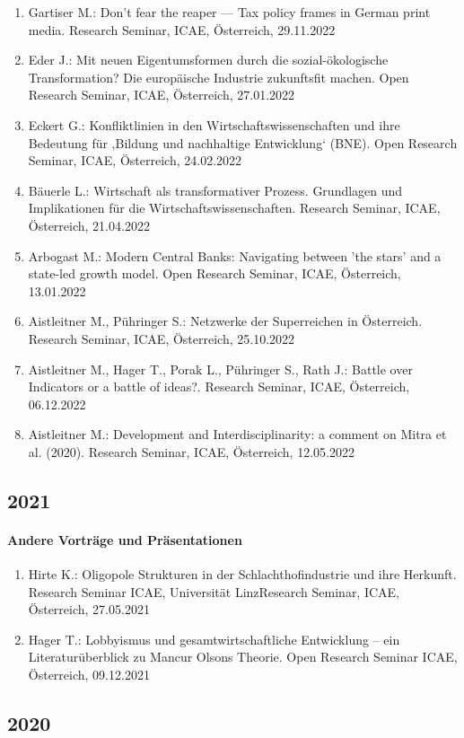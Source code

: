 \begin{enumerate}
	\item Gartiser M.: Don’t fear the reaper — Tax policy frames in German print media. Research Seminar, ICAE, Österreich, 29.11.2022
	\item Eder J.: Mit neuen Eigentumsformen durch die sozial-ökologische Transformation? Die europäische Industrie zukunftsfit machen. Open Research Seminar, ICAE, Österreich, 27.01.2022
	\item Eckert G.: Konfliktlinien in den Wirtschaftswissenschaften und ihre Bedeutung für ‚Bildung und nachhaltige Entwicklung‘ (BNE). Open Research Seminar, ICAE, Österreich, 24.02.2022
	\item Bäuerle L.: Wirtschaft als transformativer Prozess. Grundlagen und Implikationen für die Wirtschaftswissenschaften. Research Seminar, ICAE, Österreich, 21.04.2022
	\item Arbogast M.: Modern Central Banks: Navigating between 'the stars' and a state-led growth model. Open Research Seminar, ICAE, Österreich, 13.01.2022
	\item Aistleitner M., Pühringer S.: Netzwerke der Superreichen in Österreich. Research Seminar, ICAE, Österreich, 25.10.2022
	\item Aistleitner M., Hager T., Porak L., Pühringer S., Rath J.: Battle over Indicators or a battle of ideas?. Research Seminar, ICAE, Österreich, 06.12.2022
	\item Aistleitner M.: Development and Interdisciplinarity: a comment on Mitra et al. (2020). Research Seminar, ICAE, Österreich, 12.05.2022
\end{enumerate}
\subsection*{2021}
\paragraph{Andere Vorträge und Präsentationen}
\begin{enumerate}
	\item Hirte K.: Oligopole Strukturen in der Schlachthofindustrie und ihre Herkunft. Research Seminar ICAE, Universität LinzResearch Seminar, ICAE, Österreich, 27.05.2021
	\item Hager T.: Lobbyismus und gesamtwirtschaftliche Entwicklung – ein Literaturüberblick zu Mancur Olsons Theorie. Open Research Seminar ICAE, Österreich, 09.12.2021
\end{enumerate}
\subsection*{2020}
